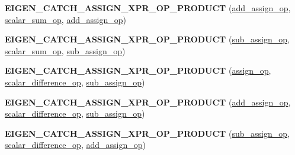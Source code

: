 \begin{DoxyCompactItemize}
\item 
\mbox{\label{namespace_eigen_1_1internal_a068fff0acae98704ea1686e613be8fa8}} 
{\bfseries E\+I\+G\+E\+N\+\_\+\+C\+A\+T\+C\+H\+\_\+\+A\+S\+S\+I\+G\+N\+\_\+\+X\+P\+R\+\_\+\+O\+P\+\_\+\+P\+R\+O\+D\+U\+CT} (\hyperlink{struct_eigen_1_1internal_1_1add__assign__op}{add\+\_\+assign\+\_\+op}, \hyperlink{struct_eigen_1_1internal_1_1scalar__sum__op}{scalar\+\_\+sum\+\_\+op}, \hyperlink{struct_eigen_1_1internal_1_1add__assign__op}{add\+\_\+assign\+\_\+op})
\item 
\mbox{\label{namespace_eigen_1_1internal_a575cb1d2d4554ab598d954294d3c53bf}} 
{\bfseries E\+I\+G\+E\+N\+\_\+\+C\+A\+T\+C\+H\+\_\+\+A\+S\+S\+I\+G\+N\+\_\+\+X\+P\+R\+\_\+\+O\+P\+\_\+\+P\+R\+O\+D\+U\+CT} (\hyperlink{struct_eigen_1_1internal_1_1sub__assign__op}{sub\+\_\+assign\+\_\+op}, \hyperlink{struct_eigen_1_1internal_1_1scalar__sum__op}{scalar\+\_\+sum\+\_\+op}, \hyperlink{struct_eigen_1_1internal_1_1sub__assign__op}{sub\+\_\+assign\+\_\+op})
\item 
\mbox{\label{namespace_eigen_1_1internal_ad4da05a6d04ee1be3ac6e1939e5c80c5}} 
{\bfseries E\+I\+G\+E\+N\+\_\+\+C\+A\+T\+C\+H\+\_\+\+A\+S\+S\+I\+G\+N\+\_\+\+X\+P\+R\+\_\+\+O\+P\+\_\+\+P\+R\+O\+D\+U\+CT} (\hyperlink{struct_eigen_1_1internal_1_1assign__op}{assign\+\_\+op}, \hyperlink{struct_eigen_1_1internal_1_1scalar__difference__op}{scalar\+\_\+difference\+\_\+op}, \hyperlink{struct_eigen_1_1internal_1_1sub__assign__op}{sub\+\_\+assign\+\_\+op})
\item 
\mbox{\label{namespace_eigen_1_1internal_a3aedb4391ed660d4b198aba8698200e7}} 
{\bfseries E\+I\+G\+E\+N\+\_\+\+C\+A\+T\+C\+H\+\_\+\+A\+S\+S\+I\+G\+N\+\_\+\+X\+P\+R\+\_\+\+O\+P\+\_\+\+P\+R\+O\+D\+U\+CT} (\hyperlink{struct_eigen_1_1internal_1_1add__assign__op}{add\+\_\+assign\+\_\+op}, \hyperlink{struct_eigen_1_1internal_1_1scalar__difference__op}{scalar\+\_\+difference\+\_\+op}, \hyperlink{struct_eigen_1_1internal_1_1sub__assign__op}{sub\+\_\+assign\+\_\+op})
\item 
\mbox{\label{namespace_eigen_1_1internal_a55e26a1218132ccc9d060b7f7441834c}} 
{\bfseries E\+I\+G\+E\+N\+\_\+\+C\+A\+T\+C\+H\+\_\+\+A\+S\+S\+I\+G\+N\+\_\+\+X\+P\+R\+\_\+\+O\+P\+\_\+\+P\+R\+O\+D\+U\+CT} (\hyperlink{struct_eigen_1_1internal_1_1sub__assign__op}{sub\+\_\+assign\+\_\+op}, \hyperlink{struct_eigen_1_1internal_1_1scalar__difference__op}{scalar\+\_\+difference\+\_\+op}, \hyperlink{struct_eigen_1_1internal_1_1add__assign__op}{add\+\_\+assign\+\_\+op})

\end{DoxyCompactItemize}
